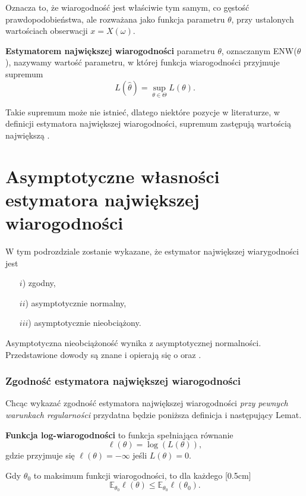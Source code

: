 Oznacza to, że wiarogodność jest właściwie tym samym, co gęstość prawdopodobieństwa,
ale rozważana jako funkcja parametru $\theta$, przy ustalonych wartościach obserwacji
$x = X(\omega)$.


\begin{definition}
\textbf{Estymatorem największej wiarogodności} parametru $\theta$, oznaczanym ENW($\theta$), nazywamy wartość parametru, w której funkcja
wiarogodności przyjmuje supremum $$L(\hat{\theta}) = \sup_{\theta \in \Theta} L(\theta).$$

\end{definition}

Takie supremum może nie istnieć, dlatego niektóre pozycje w literaturze, w definicji estymatora największej wiarogodności, supremum zastępują wartością największą \citep{rydl1,sfu1,mit0}.

\section{Asymptotyczne własności estymatora największej wiarogodności}

W tym podrozdziale zostanie wykazane, że estymator największej wiarygodności jest
\begin{enumerate}
\item[$i$)] zgodny,
\item[$ii$)] asymptotycznie normalny,
\item[$iii$)] asymptotycznie nieobciążony.
\end{enumerate}

Asymptotyczna nieobciążoność wynika z asymptotycznej normalności. Przedstawione dowody są znane i opierają się o \cite{mit1} oraz \cite{sfu1}.



\subsubsection{Zgodność estymatora największej wiarogodności}

Chcąc wykazać zgodność estymatora największej wiarogodności \textit{przy pewnych warunkach regularności}
przydatna będzie poniższa definicja i następujący Lemat.
\begin{definition}
\textbf{Funkcja log-wiarogodności} to funkcja spełniająca równanie
$$\ell(\theta) = \log(L(\theta)),$$
gdzie przyjmuje się $\ell(\theta) = -\infty$ jeśli $L(\theta) = 0$.
\end{definition}

\begin{lemma}\label{l:pierwszy}
Gdy $\theta_0$ to maksimum funkcji wiarogodności, to dla każdego \text{$\theta \in \Theta$}
[0.5cm]
\begin{equation*}
\mathbb{E}_{\theta_0}\ell(\theta) \leq \mathbb{E}_{\theta_0}\ell(\theta_0).
\end{equation*}
\end{lemma}

